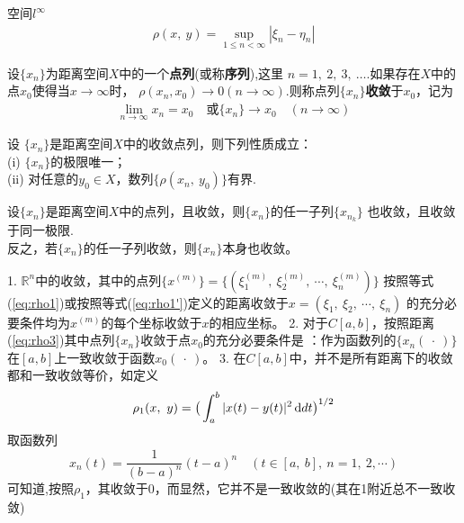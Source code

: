 \begin{newex}
	空间$l^\infty$
	\begin{align}
		\rho(x, \ y)= \sup_{1 \leqslant n < \infty} |\xi_n-\eta_n|
	\end{align}
\end{newex}

\begin{newdef}
	设$\{ x_n \}$为距离空间$X$中的一个\textbf{点列}(或称\textbf{序列}),这里
	$n=1,\ 2,\ 3,\ \dots$.如果存在$X$中的点$x_0$使得当$x \rightarrow \infty$时，
	$\rho(x_n,x_0) \rightarrow 0 (n \rightarrow \infty)$.则称点列$\{x_n \}$\textbf{收敛}于$x_0$，记为
	\begin{align*}
		\lim_{n \rightarrow \infty} x_n =x_0 \quad \mbox{或} \{x_n\} \rightarrow x_0 \quad (n \rightarrow \infty)
	\end{align*}
\end{newdef}

\begin{newthem}
	设 $\{ x_n\}$是距离空间$X$中的收敛点列，则下列性质成立：\\
	(i) $\{x_n \}$的极限唯一；\\
	(ii) 对任意的$y_0 \in X$，数列$\{\rho (x_n, \ y_0) \}$有界.
\end{newthem}

\begin{newthem}
	设$\{ x_n \}$是距离空间$X$中的点列，且收敛，则$\{x_n \}$的任一子列$\{ x_{n_k} \}$
	也收敛，且收敛于同一极限.\\
	反之，若$\{ x_n \}$的任一子列收敛，则$\{ x_n\}$本身也收敛。
\end{newthem}

\begin{note}
	1. $\mathbb R^n$中的收敛，其中的点列$\{ x^{(m)}\} = \{  (\xi_1^{(m)},\ \xi_2^{(m)},\ \cdots , \ \xi_n^{(m)}) \}$
	按照等式(\ref{eq:rho1})或按照等式(\ref{eq:rho1'})定义的距离收敛于$x = (\xi_1, \ \xi_2 , \ \cdots , \ \xi_n)$
	的充分必要条件均为$x ^{(m)}$的每个坐标收敛于$x$的相应坐标。
    2. 对于$C[a,b]$，按照距离(\ref{eq:rho3})其中点列$\{ x_n\}$收敛于点$x_0$的充分必要条件是
    ：作为函数列的$\{x_n(\  \cdot\  )\}$在$\left[ a,b \right]$上一致收敛于函数$x_0(\ \cdot \ )$。
    3. 在$C[a,b]$中，并不是所有距离下的收敛都和一致收敛等价，如定义
    $$\rho_1(x,\ y)=\big(  \int_a^b |x(t)-y(t)|^2 \operatorname{d\!} d t   \big)^{1/2}$$
    取函数列$$x_n(t)=\dfrac{1}{(b-a)^n}(t-a)^n \quad \left(  t \in \left[a,\ b \right],\ n=1,\ 2, \cdots \right) $$
    可知道,按照$\rho_1$，其收敛于0，而显然，它并不是一致收敛的(其在1附近总不一致收敛)
\end{note}

